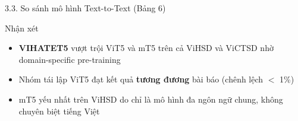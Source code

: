 \documentclass[11pt, aspectratio=169]{beamer}
\begin{document}
\begin{frame}[shrink=8]{3.3. So sánh mô hình Text-to-Text (Bảng 6)}

\begin{table}[h]
  \centering
  \caption{Kết quả sau huấn luyện so với các mô hình có kiến trúc Text-to-Text}
  \vspace{0.2cm}
\end{table}

\begin{block}{Nhận xét}
  \begin{itemize}
    \item \textbf{VIHATET5} vượt trội ViT5 và mT5 trên cả ViHSD và ViCTSD nhờ domain-specific pre-training
    \item Nhóm tái lập ViT5 đạt kết quả \textbf{tương đương} bài báo (chênh lệch $<$ 1\%)
    \item mT5 yếu nhất trên ViHSD do chỉ là mô hình đa ngôn ngữ chung, không chuyên biệt tiếng Việt
  \end{itemize}
\end{block}
\end{frame}
\end{document}

